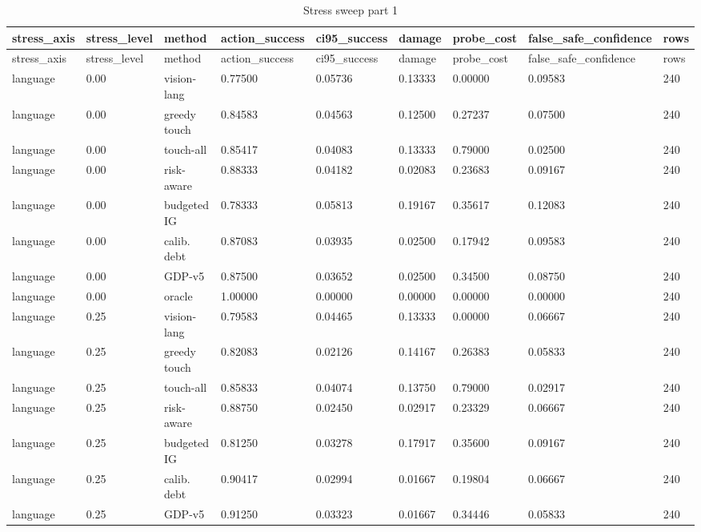 \documentclass{article}
\begin{document}
\begin{center}
\tiny
\renewcommand{\arraystretch}{0.92}
\setlength{\tabcolsep}{3pt}
\begin{longtable}{lllllllll}
\caption{Stress sweep part 1}\label{tab:stress-sweep-1}\\
\toprule
stress\_axis & stress\_level & method & action\_success & ci95\_success & damage & probe\_cost & false\_safe\_confidence & rows \\
\midrule
\endfirsthead
\toprule
stress\_axis & stress\_level & method & action\_success & ci95\_success & damage & probe\_cost & false\_safe\_confidence & rows \\
\midrule
\endhead
language & 0.00 & vision-lang & 0.77500 & 0.05736 & 0.13333 & 0.00000 & 0.09583 & 240 \\
language & 0.00 & greedy touch & 0.84583 & 0.04563 & 0.12500 & 0.27237 & 0.07500 & 240 \\
language & 0.00 & touch-all & 0.85417 & 0.04083 & 0.13333 & 0.79000 & 0.02500 & 240 \\
language & 0.00 & risk-aware & 0.88333 & 0.04182 & 0.02083 & 0.23683 & 0.09167 & 240 \\
language & 0.00 & budgeted IG & 0.78333 & 0.05813 & 0.19167 & 0.35617 & 0.12083 & 240 \\
language & 0.00 & calib. debt & 0.87083 & 0.03935 & 0.02500 & 0.17942 & 0.09583 & 240 \\
language & 0.00 & GDP-v5 & 0.87500 & 0.03652 & 0.02500 & 0.34500 & 0.08750 & 240 \\
language & 0.00 & oracle & 1.00000 & 0.00000 & 0.00000 & 0.00000 & 0.00000 & 240 \\
language & 0.25 & vision-lang & 0.79583 & 0.04465 & 0.13333 & 0.00000 & 0.06667 & 240 \\
language & 0.25 & greedy touch & 0.82083 & 0.02126 & 0.14167 & 0.26383 & 0.05833 & 240 \\
language & 0.25 & touch-all & 0.85833 & 0.04074 & 0.13750 & 0.79000 & 0.02917 & 240 \\
language & 0.25 & risk-aware & 0.88750 & 0.02450 & 0.02917 & 0.23329 & 0.06667 & 240 \\
language & 0.25 & budgeted IG & 0.81250 & 0.03278 & 0.17917 & 0.35600 & 0.09167 & 240 \\
language & 0.25 & calib. debt & 0.90417 & 0.02994 & 0.01667 & 0.19804 & 0.06667 & 240 \\
language & 0.25 & GDP-v5 & 0.91250 & 0.03323 & 0.01667 & 0.34446 & 0.05833 & 240 \\

\end{longtable}
\end{center}
\end{document}

